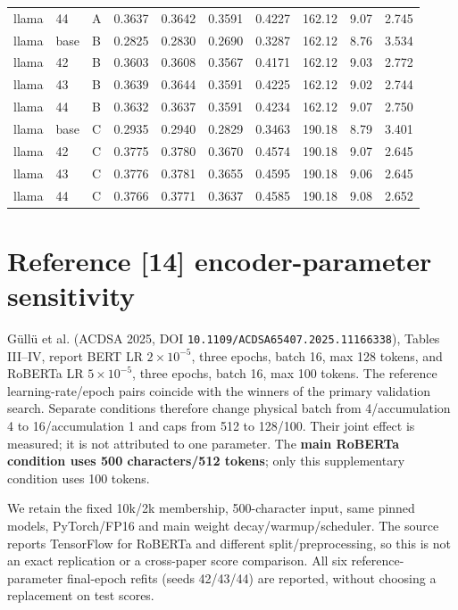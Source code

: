 \documentclass[10pt,a4paper]{article}
\begin{document}
\begin{landscape}
{\begin{longtable}{@{}lllrrrrrrr@{}}
llama & 44 & A & 0.3637 & 0.3642 & 0.3591 & 0.4227 & 162.12 & 9.07 & 2.745 \\
llama & base & B & 0.2825 & 0.2830 & 0.2690 & 0.3287 & 162.12 & 8.76 & 3.534 \\
llama & 42 & B & 0.3603 & 0.3608 & 0.3567 & 0.4171 & 162.12 & 9.03 & 2.772 \\
llama & 43 & B & 0.3639 & 0.3644 & 0.3591 & 0.4225 & 162.12 & 9.02 & 2.744 \\
llama & 44 & B & 0.3632 & 0.3637 & 0.3591 & 0.4234 & 162.12 & 9.07 & 2.750 \\
llama & base & C & 0.2935 & 0.2940 & 0.2829 & 0.3463 & 190.18 & 8.79 & 3.401 \\
llama & 42 & C & 0.3775 & 0.3780 & 0.3670 & 0.4574 & 190.18 & 9.07 & 2.645 \\
llama & 43 & C & 0.3776 & 0.3781 & 0.3655 & 0.4595 & 190.18 & 9.06 & 2.645 \\
llama & 44 & C & 0.3766 & 0.3771 & 0.3637 & 0.4585 & 190.18 & 9.08 & 2.652 \\
\end{longtable}
}

\end{landscape}

\section{Reference [14] encoder-parameter sensitivity}\label{sup:ref14}


G\"ull\"u et al. (ACDSA 2025, DOI \nolinkurl{10.1109/ACDSA65407.2025.11166338}), Tables III--IV, report BERT LR $2\times10^{-5}$, three epochs, batch 16, max 128 tokens, and RoBERTa LR $5\times10^{-5}$, three epochs, batch 16, max 100 tokens. The reference learning-rate/epoch pairs coincide with the winners of the primary validation search. Separate conditions therefore change physical batch from 4/accumulation 4 to 16/accumulation 1 and caps from 512 to 128/100. Their joint effect is measured; it is not attributed to one parameter. The \textbf{main RoBERTa condition uses 500 characters/512 tokens}; only this supplementary condition uses 100 tokens.

We retain the fixed 10k/2k membership, 500-character input, same pinned models, PyTorch/FP16 and main weight decay/warmup/scheduler. The source reports TensorFlow for RoBERTa and different split/preprocessing, so this is not an exact replication or a cross-paper score comparison. All six reference-parameter final-epoch refits (seeds 42/43/44) are reported, without choosing a replacement on test scores.
\end{document}
